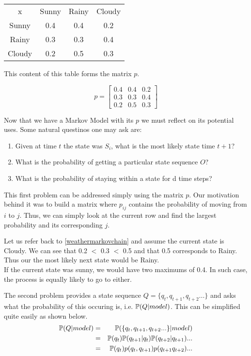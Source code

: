 \begin{center}
	\begin{tabular}{c c c c}
		x      & Sunny & Rainy & Cloudy \\
		Sunny  & 0.4   & 0.4   & 0.2 \\
		Rainy  & 0.3   & 0.3   & 0.4 \\ 
		Cloudy & 0.2   & 0.5   & 0.3 
	\end{tabular}
\end{center}

This content of this table forms the matrix $p$. 

\begin{equation}
p = 
\begin{bmatrix}
	0.4 & 0.4 & 0.2 \\
	0.3 & 0.3 & 0.4 \\
	0.2 & 0.5 & 0.3 
	\end{bmatrix}
\end{equation}

Now that we have a Markov Model with its $p$ we must reflect on its potential uses. Some natural questinos one may ask are:
\begin{enumerate}
	\item Given at time $t$ the state was $S_i$, what is the most likely state time $t+1$?
	\item What is the probability of getting a particular state sequence $O$?
	\item What is the probability of staying within a state for d time steps?
\end{enumerate}

This first problem can be addressed simply using the matrix $p$. Our motivation behind it was to build a matrix where $p_{ij}$ contains the probability of moving from $i$ to $j$. Thus, we can simply look at the current row and find the largest probability and its corresponding $j$.
\begin{example}
	Let us refer back to \ref{weathermarkovchain} and assume the current state is Cloudy. We can see that 0.2 $<$ 0.3 $<$ 0.5 and that 0.5 corresponds to Rainy. Thus our the most likely next state would be Rainy. 
	\\
	If the current state was sunny, we would have two maximums of 0.4. In such case, the process is equally likely to go to either. 
\end{example}

The second problem provides a state sequence $Q = \{q_t,q_{t+1},q_{t+2}...\}$ and asks what the probability of this occuring is, i.e. $\mathbb{P} (Q | model)$. This can be simplified quite easily as shown below.
\begin{eqnarray}
	\label{markovchainstateseqprob}
	\mathbb{P} (Q | model) & = & \mathbb{P} (\{q_t,q_{t+1},q_{t+2}...\} | model) \\
					  & = & \mathbb{P} (q_{t}) \mathbb{P} (q_{t+1}| q_{t}) \mathbb{P} (q_{t+2}| q_{t+1})... \\
					  & = & \mathbb{P} (q_t) p(q_t,q_{t+1}) p(q_{t+1}q_{t+2}) ...
\end{eqnarray}

